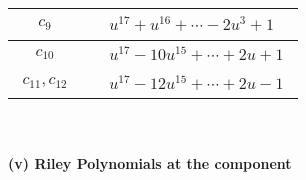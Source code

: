 \documentclass[1p]{elsarticle_modified}
\theoremstyle{definition}
\begin{document}
\begin{tabular}{m{50pt}|m{274pt}}
\hline $$\begin{aligned}c_{9}\end{aligned}$$&$\begin{aligned}
&u^{17}+u^{16}+\cdots-2 u^3+1
\end{aligned}$\\
\hline $$\begin{aligned}c_{10}\end{aligned}$$&$\begin{aligned}
&u^{17}-10 u^{15}+\cdots+2 u+1
\end{aligned}$\\
\hline $$\begin{aligned}c_{11},c_{12}\end{aligned}$$&$\begin{aligned}
&u^{17}-12 u^{15}+\cdots+2 u-1
\end{aligned}$\\
\hline
\end{tabular}\\~\\
\newpage\renewcommand{\arraystretch}{1}
\flushleft \textbf{(v) Riley Polynomials at the component}\newline \\
\end{document}
